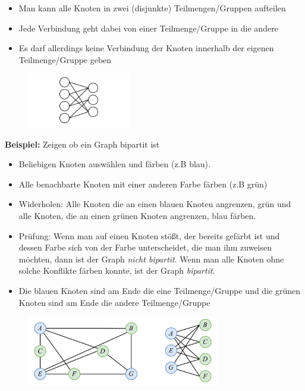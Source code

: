 \begin{itemize}
\item Man kann alle Knoten in zwei (disjunkte) Teilmengen/Gruppen aufteilen
\item Jede Verbindung geht dabei von einer Teilmenge/Gruppe in die andere
\item Es darf allerdings keine Verbindung der Knoten innerhalb der eigenen Teilmenge/Gruppe geben
\end{itemize}

\begin{figure}[h]
\centering
\includegraphics[width=0.4\textwidth]{graphics/graph_bipartit.png}
\end{figure}

\textbf{Beispiel:} Zeigen ob ein Graph bipartit ist

\begin{itemize}
\item Beliebigen Knoten auswählen und färben (z.B blau).
\item Alle benachbarte Knoten mit einer anderen Farbe färben (z.B grün)
\item Widerholen: Alle Knoten die an einen blauen Knoten angrenzen, grün und alle Knoten, die an einen grünen Knoten angrenzen, blau färben.
\item Prüfung: Wenn man auf einen Knoten stößt, der bereits gefärbt ist und dessen Farbe sich von der Farbe unterscheidet, die man ihm zuweisen möchten, dann ist der Graph \textit{nicht bipartit}. Wenn man alle Knoten ohne solche Konflikte färben konnte, ist der Graph \textit{bipartit}.
\item Die blauen Knoten sind am Ende die eine Teilmenge/Gruppe und die grünen Knoten sind am Ende die andere Teilmenge/Gruppe
\end{itemize}

\begin{figure}[h]
\centering
\includegraphics[width=0.75\textwidth]{graphics/graph_bipartit2.png}
\end{figure}


